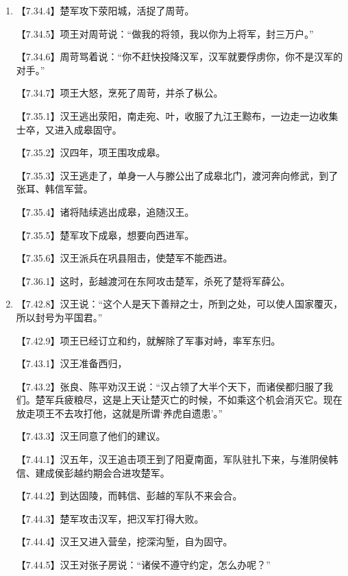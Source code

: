 \documentclass[fontset=none,11pt,a4paper]{ctexart}
\begin{document}
\begin{enumerate}[label=\Alph*.]
  \item
\noindent 【7.34.4】楚军攻下荥阳城，活捉了周苛。\par
\noindent 【7.34.5】项王对周苛说：“做我的将领，我以你为上将军，封三万户。”\par
\noindent 【7.34.6】周苛骂着说：“你不赶快投降汉军，汉军就要俘虏你，你不是汉军的对手。”\par
\noindent 【7.34.7】项王大怒，烹死了周苛，并杀了枞公。\par
\noindent 【7.35.1】汉王逃出荥阳，南走宛、叶，收服了九江王黥布，一边走一边收集士卒，又进入成皋固守。\par
\noindent 【7.35.2】汉四年，项王围攻成皋。\par
\noindent 【7.35.3】汉王逃走了，单身一人与滕公出了成皋北门，渡河奔向修武，到了张耳、韩信军营。\par
\noindent 【7.35.4】诸将陆续逃出成皋，追随汉王。\par
\noindent 【7.35.5】楚军攻下成皋，想要向西进军。\par
\noindent 【7.35.6】汉王派兵在巩县阻击，使楚军不能西进。\par
\noindent 【7.36.1】这时，彭越渡河在东阿攻击楚军，杀死了楚将军薛公。\par
  \item
\noindent 【7.42.8】汉王说：“这个人是天下善辩之士，所到之处，可以使人国家覆灭，所以封号为平国君。”\par
\noindent 【7.42.9】项王已经订立和约，就解除了军事对峙，率军东归。\par
\noindent 【7.43.1】汉王准备西归，\par
\noindent 【7.43.2】张良、陈平劝汉王说：“汉占领了大半个天下，而诸侯都归服了我们。楚军兵疲粮尽，这是上天让楚灭亡的时候，不如乘这个机会消灭它。现在放走项王不去攻打他，这就是所谓‘养虎自遗患’。”\par
\noindent 【7.43.3】汉王同意了他们的建议。\par
\noindent 【7.44.1】汉五年，汉王追击项王到了阳夏南面，军队驻扎下来，与淮阴侯韩信、建成侯彭越约期会合进攻楚军。\par
\noindent 【7.44.2】到达固陵，而韩信、彭越的军队不来会合。\par
\noindent 【7.44.3】楚军攻击汉军，把汉军打得大败。\par
\noindent 【7.44.4】汉王又进入营垒，挖深沟堑，自为固守。\par
\noindent 【7.44.5】汉王对张子房说：“诸侯不遵守约定，怎么办呢？”\par

\end{enumerate}
\end{document}
